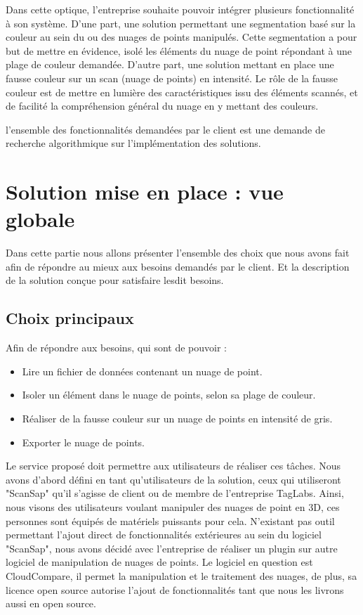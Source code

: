 \documentclass[12pt,titlepage,french]{article}
\begin{document}
Dans cette optique, l'entreprise souhaite pouvoir intégrer plusieurs fonctionnalité à son système. D'une part, une solution permettant une segmentation basé sur la couleur au sein du ou des nuages de points manipulés. Cette segmentation a pour but de mettre en évidence, isolé les éléments du nuage de point répondant à une plage de couleur demandée. D'autre part, une solution mettant en place une fausse couleur sur un scan (nuage de points) en intensité. Le rôle de la fausse couleur est de mettre en lumière des caractéristiques issu des éléments scannés, et de facilité la compréhension général du nuage en y mettant des couleurs.

l'ensemble des fonctionnalités demandées par le client est une demande de recherche algorithmique sur l'implémentation des solutions. 
\newpage
\section{Solution mise en place : vue globale}

Dans cette partie nous allons présenter l'ensemble des choix que nous avons fait afin de répondre au mieux aux besoins demandés par le client. Et la description de la solution conçue  pour satisfaire lesdit besoins.

\subsection{Choix principaux}

Afin de répondre aux besoins, qui sont de pouvoir :
\begin{itemize}
    \item Lire un fichier de données contenant un nuage de point.
    \item Isoler un élément dans le nuage de points, selon sa plage de couleur.
    \item Réaliser de la fausse couleur sur un nuage de points en intensité de gris.
    \item Exporter le nuage de points.
\end{itemize}
Le service proposé doit permettre aux utilisateurs de réaliser ces tâches. Nous avons d'abord défini en tant qu'utilisateurs de la solution, ceux qui utiliseront "ScanSap" qu'il s'agisse de client ou de membre de l'entreprise TagLabs. Ainsi, nous visons des utilisateurs voulant manipuler des nuages de point en 3D, ces personnes sont équipés de matériels puissants pour cela.
N'existant pas outil permettant l'ajout direct de fonctionnalités extérieures au sein du logiciel "ScanSap", nous avons décidé avec l'entreprise de réaliser un plugin sur autre logiciel de manipulation de nuages de points. Le logiciel en question est CloudCompare, il permet la manipulation et le traitement des nuages, de plus, sa licence open source autorise l'ajout de fonctionnalités tant que nous les livrons aussi en open source.
\end{document}

